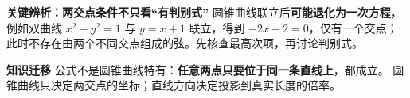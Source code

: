 \begin{explanationbox}
\textbf{\textcolor{CExplanation}{关键辨析：两交点条件不只看“有判别式”}}
圆锥曲线联立后\textbf{可能退化为一次方程}，例如双曲线
$x^2-y^2=1$ 与 $y=x+1$ 联立，得到 $-2x-2=0$，仅有一个交点；
此时不存在由两个不同交点组成的弦。先核查最高次项，再讨论判别式。

\medskip
\textbf{\textcolor{CExplanation}{知识迁移}}
公式不是圆锥曲线特有：\textbf{任意两点只要位于同一条直线上}，都成立。
圆锥曲线只决定两交点的坐标；直线方向决定投影到真实长度的倍率。
\end{explanationbox}
